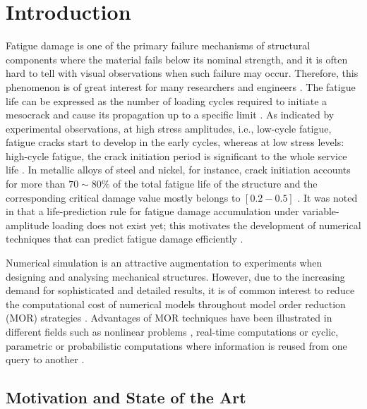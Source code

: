 \cleardoublepage
\mainmatter
\chapter{Introduction}

Fatigue damage is one of the primary failure mechanisms of structural components where the material fails below its nominal strength, and it is often hard to tell with visual observations when such failure may occur. Therefore, this phenomenon is of great interest for many researchers and engineers \parencite{lemaitre2005engineering}. The fatigue life can be expressed as the number of loading cycles required to initiate a mesocrack and cause its propagation up to a specific limit \parencite{lemaitre2005engineering}. As indicated by experimental observations, at high stress amplitudes, i.e., low-cycle fatigue, fatigue cracks start to develop in the early cycles, whereas at low stress levels: high-cycle fatigue, the crack initiation period is significant to the whole service life \parencite{sobczyk2012random}. In metallic alloys of steel and nickel, for instance, crack initiation accounts for more than $70 \sim 80\%$ of the total fatigue life of the structure \parencite{wang1999technical,deng2015grain} and the corresponding critical damage value mostly belongs to $[0.2-0.5]$ \parencite{lemaitre2005engineering}. It was noted in \parencite{schijve2003fatigue} that a life-prediction rule for fatigue damage accumulation under variable-amplitude loading does not exist yet; this motivates the development of numerical techniques that can predict fatigue damage efficiently \parencite{schijve2001fatigue}.

Numerical simulation is an attractive augmentation to experiments when designing and analysing mechanical structures. However, due to the increasing demand for sophisticated and detailed results, it is of common interest to reduce the computational cost of numerical models throughout model order reduction (MOR) strategies \parencite{chinesta_encyclo_2018}. Advantages of MOR techniques have been illustrated in different fields such as nonlinear problems \parencite{Giacoma2015,bha2017}, real-time computations \parencite{Niroomandi_2013} or cyclic, parametric or probabilistic computations where information is reused from one query to another \parencite{Heyberger2013b,bha2018temporal}.

\section{Motivation and State of the Art}

